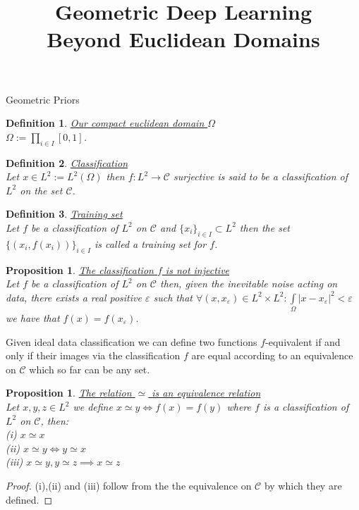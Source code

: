 \documentclass{article}
\title{Geometric Deep Learning \\ Beyond Euclidean Domains}
\author{}
\date{}
\newtheorem{prop}[thm]{Proposition}
\newtheorem{defn}{Definition}[section]
\newcommand{\eps}{\varepsilon}
\begin{document}
\maketitle
\begin{section}{Geometric Priors}

\begin{defn}\underline{Our compact euclidean domain $\Omega$}\\
$\Omega := \prod_{i \in I}[0,1]$.
\end{defn}

\begin{defn}\underline{Classification}\\
Let $x \in L^2 := L^2(\Omega)$ then $f : L^2 \to \mathcal{C}$ surjective
is said to be a classification of $L^2$ on the set $\mathcal{C}$.
\end{defn}

\begin{defn}\underline{Training set}\\
Let $f$ be a classification of $L^2$ on $\mathcal{C}$ and $\{x_i\}_{i \in I}\subset L^2$
then the set $\{(x_i,f(x_i))\}_{i \in I}$ is called a training set for $f$.
\end{defn}

\begin{prop}\underline{The classification $f$ is not injective}\\
Let $f$ be a classification of $L^2$ on $\mathcal{C}$ then, given the inevitable noise acting on data,
there exists a real positive $\eps$ such that $\forall (x,x_\eps) \in L^2\times L^2: \int\limits_\Omega{|x-x_\eps|^2}<\eps$
we have that $f(x)=f(x_\eps)$.
\end{prop}

Given ideal data classification we can define two functions $f$-equivalent if and only if 
their images via the classification $f$ are equal according to an equivalence on $\mathcal{C}$ which so far can be any set.

\begin{prop}\underline{The relation $\simeq$ is an equivalence relation}\\
Let $x,y,z \in L^2$ we define $x\simeq y \iff f(x)=f(y)$ where $f$ is a classification of $L^2$ on $\mathcal{C}$,
then:\\
(i) $x \simeq x$\\
(ii) $x \simeq y \iff y \simeq x$\\
(iii) $x \simeq y, y \simeq z \implies x \simeq z$
\end{prop}
\begin{proof}
(i),(ii) and (iii) follow from the the equivalence on $\mathcal{C}$ by which they are defined.
\end{proof}


\end{section}
\end{document}

